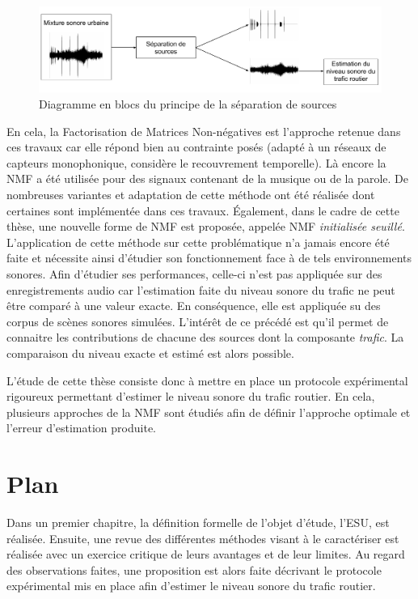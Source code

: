 \begin{figure}[h]
\centering
\includegraphics[width=0.9\linewidth]{./figures/autres/schema_source_separation_FR.pdf}
\caption{Diagramme en blocs du principe de la séparation de sources}
\label{fig:separation_source}
\end{figure}


En cela, la Factorisation de Matrices Non-négatives \cite{lee_learning_1999} est l'approche retenue dans ces travaux car elle répond bien au contrainte posés (adapté à un réseaux de capteurs monophonique, considère le recouvrement temporelle). Là encore la NMF a été utilisée pour des signaux contenant de la musique ou de la parole. De nombreuses variantes et adaptation de cette méthode ont été réalisée dont certaines sont implémentée dans ces travaux. Également, dans le cadre de cette thèse, une nouvelle forme de NMF est proposée, appelée NMF \textit{initialisée seuillé}. L'application de cette méthode sur cette problématique n'a jamais encore été faite et nécessite ainsi d'étudier son fonctionnement face à de tels environnements sonores. 
Afin d'étudier ses performances, celle-ci n'est pas appliquée sur des enregistrements audio car l'estimation faite du niveau sonore du trafic ne peut être comparé à une valeur exacte. En conséquence, elle est appliquée su des corpus de scènes sonores simulées. L'intérêt de ce précédé est qu'il permet de connaitre les contributions de chacune des sources dont la composante \textit{trafic}. La comparaison du niveau exacte et estimé est alors possible.

L'étude de cette thèse consiste donc à mettre en place un protocole expérimental rigoureux permettant d'estimer le niveau sonore du trafic routier. En cela, plusieurs approches de la NMF sont étudiés afin de définir l'approche optimale et l'erreur d'estimation produite.

\section{Plan}

Dans un premier chapitre, la définition formelle de l'objet d'étude, l'ESU, est réalisée. Ensuite, une revue des différentes méthodes visant à le caractériser est réalisée avec un exercice critique de leurs avantages et de leur limites. Au regard des observations faites, une proposition est alors faite décrivant le protocole expérimental mis en place afin d'estimer le niveau sonore du trafic routier.

